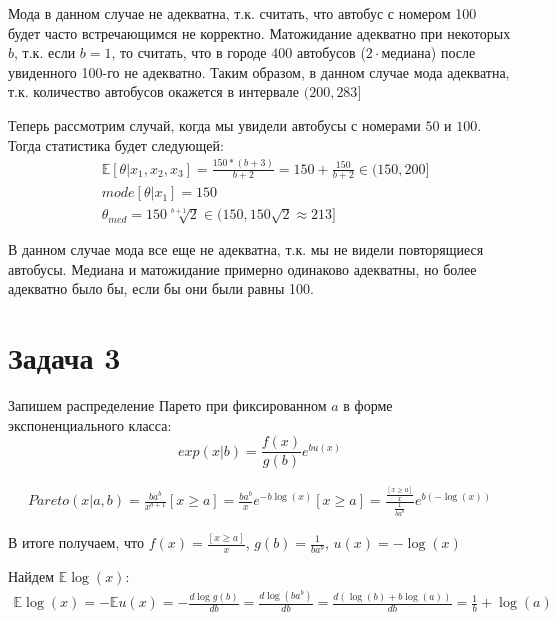 \documentclass[12pt, a4paper]{article}
\begin{document}
    Мода в данном случае не адекватна, т.к. считать, что автобус с номером 100 будет часто встречающимся не корректно. Матожидание адекватно при некоторых $b$, т.к. если $b = 1$, то считать, что в городе $400$ автобусов ($2\cdot$медиана) после увиденного 100-го не адекватно. Таким образом, в данном случае мода адекватна, т.к. количество автобусов окажется в интервале $(200, 283]$

    Теперь рассмотрим случай, когда мы увидели автобусы с номерами $50$ и $100$. Тогда статистика будет следующей:
    \begin{align*}
        &\mathbb{E}[\theta|x_1, x_2, x_3] = \frac{150 * (b + 3)}{b + 2} = 150 + \frac{150}{b + 2} \in (150, 200]\\
        &mode[\theta|x_1] = 150\\
        &\theta_{med} = 150\sqrt[b+1]{2} \in (150, 150\sqrt{2} \approx 213]
    \end{align*}

    В данном случае мода все еще не адекватна, т.к. мы не видели повторящиеся автобусы. Медиана и матожидание примерно одинаково адекватны, но более адекватно было бы, если бы они были равны 100.

    \section{Задача 3}

    Запишем распределение Парето при фиксированном $a$ в форме экспоненциального класса:
    $$exp(x|b) = \frac{f(x)}{g(b)}e^{bu(x)}$$

    \begin{gather*}
        Pareto(x|a,b) = \frac{ba^b}{x^{b+1}}[x \geq a] = \frac{ba^b}{x}e^{-b \log(x)}[x \geq a] =
        \frac{\frac{[x \geq a]}{x}}{\frac{1}{ba^b}} e^{b (-\log(x))}
    \end{gather*}

    В итоге получаем, что $f(x) = \frac{[x \geq a]}{x}$, $g(b) = \frac{1}{ba^b}$, $u(x) = -\log(x)$

    Найдем $\mathbb{E}\log(x)$:
    \begin{gather*}
        \mathbb{E}\log(x) = -\mathbb{E} u(x) = - \frac{d \log g(b)}{d b} = \frac{d \log(ba^b)}{d b} =
        \frac{d (\log(b) + b \log(a))}{d b} = \frac{1}{b} + \log(a)
    \end{gather*}
\end{document}
